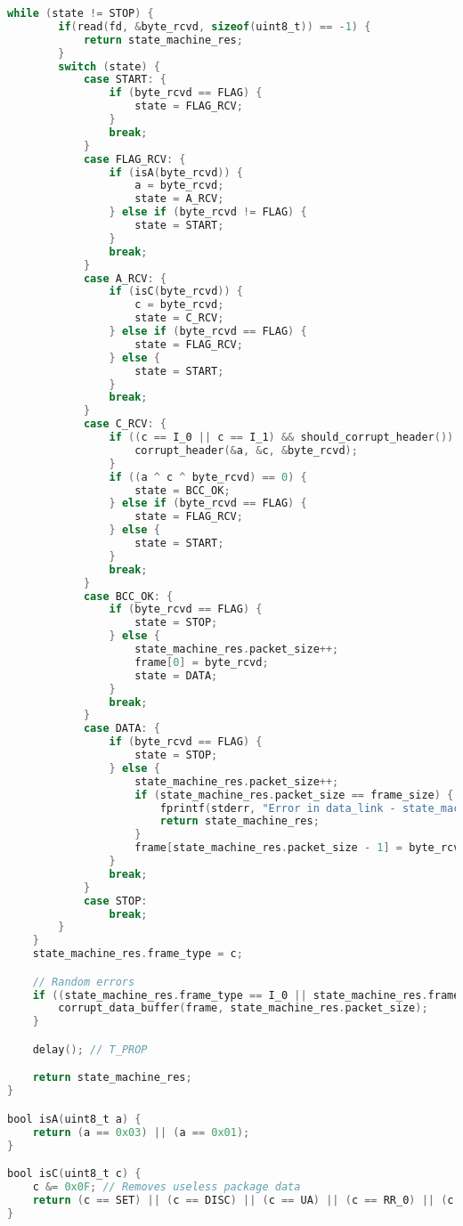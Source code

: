 \begin{lstlisting}[language=C, caption=state_machine.c]
    while (state != STOP) {
        if(read(fd, &byte_rcvd, sizeof(uint8_t)) == -1) {
            return state_machine_res;
        }
        switch (state) {
            case START: {
                if (byte_rcvd == FLAG) {
                    state = FLAG_RCV;
                }
                break;
            }
            case FLAG_RCV: {
                if (isA(byte_rcvd)) {
                    a = byte_rcvd;
                    state = A_RCV;
                } else if (byte_rcvd != FLAG) {
                    state = START;
                }
                break;
            }
            case A_RCV: {
                if (isC(byte_rcvd)) {
                    c = byte_rcvd;
                    state = C_RCV;
                } else if (byte_rcvd == FLAG) {
                    state = FLAG_RCV;
                } else {
                    state = START;
                }
                break;
            }
            case C_RCV: {
                if ((c == I_0 || c == I_1) && should_corrupt_header()) {
                    corrupt_header(&a, &c, &byte_rcvd);
                }
                if ((a ^ c ^ byte_rcvd) == 0) {
                    state = BCC_OK;
                } else if (byte_rcvd == FLAG) {
                    state = FLAG_RCV;
                } else {
                    state = START;
                }
                break;
            }
            case BCC_OK: {
                if (byte_rcvd == FLAG) {
                    state = STOP;
                } else {
                    state_machine_res.packet_size++;
                    frame[0] = byte_rcvd;
                    state = DATA;
                }
                break;
            }
            case DATA: {
                if (byte_rcvd == FLAG) {
                    state = STOP;
                } else {
                    state_machine_res.packet_size++;
                    if (state_machine_res.packet_size == frame_size) {
                        fprintf(stderr, "Error in data_link - state_machine: receiving more bytes than the max frame size\n");
                        return state_machine_res;
                    } 
                    frame[state_machine_res.packet_size - 1] = byte_rcvd;
                }
                break;
            }
            case STOP:
                break;
        }
    }
    state_machine_res.frame_type = c;

    // Random errors
    if ((state_machine_res.frame_type == I_0 || state_machine_res.frame_type == I_1) && should_corrupt_data()) {
        corrupt_data_buffer(frame, state_machine_res.packet_size);
    }

    delay(); // T_PROP

    return state_machine_res;
}

bool isA(uint8_t a) {
    return (a == 0x03) || (a == 0x01);
}

bool isC(uint8_t c) {
    c &= 0x0F; // Removes useless package data
    return (c == SET) || (c == DISC) || (c == UA) || (c == RR_0) || (c == REJ_0) || (c == I_0) || (c == I_1);
}





\end{lstlisting}

